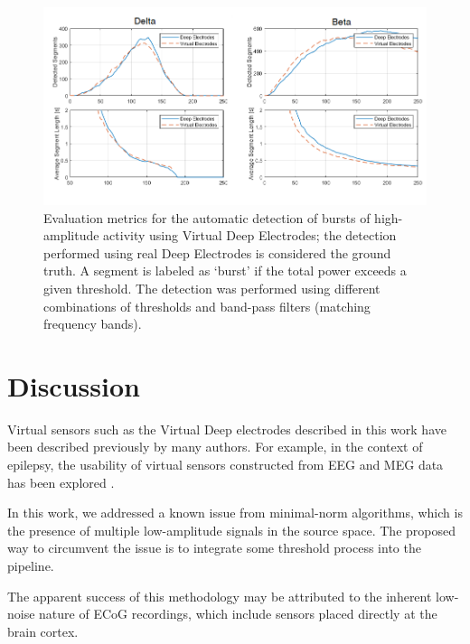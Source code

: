 \documentclass[draftcls, onecolumn, peerreview]{IEEEtran}
\begin{document}
\begin{figure}[!t]
\centering
\includegraphics[width=16cm]{./graph_agree/improvised}
\caption{Evaluation metrics for the automatic detection of bursts of high-amplitude activity using Virtual Deep Electrodes; the detection performed using real Deep Electrodes is considered the ground truth. 
A segment is labeled as `burst' if the total power exceeds a given threshold.
The detection was performed using different combinations of thresholds and band-pass filters (matching frequency bands).}
\label{fig:segment_stats}
\end{figure}


\section{Discussion}
\label{sec:discussion}

Virtual sensors such as the Virtual Deep electrodes described in this work have been described previously by many authors.
%
For example, in the context of epilepsy, the usability of virtual sensors constructed from EEG and MEG data has been explored \cite{sohrabpour2020noninvasive,tamilia2021noninvasive}.

In this work, we addressed a known issue from minimal-norm algorithms, which is the presence of multiple low-amplitude signals in the source space.
%
The proposed way to circumvent the issue is to integrate some threshold process into the pipeline.


The apparent success of this methodology may be attributed to the inherent low-noise nature of ECoG recordings, which include sensors placed directly at the brain cortex.
\end{document}
